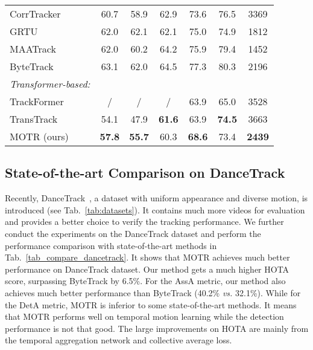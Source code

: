 \documentclass[runningheads]{llncs}
\begin{document}
\begin{table}[t]
{\begin{tabular}{l|cccccc}
      CorrTracker \cite{wang2021multiple}         & 60.7           & 58.9           & 62.9           & 73.6           & 76.5           & 3369            \\
      GRTU \cite{wang2021general}                 & 62.0           & 62.1           & 62.1           & 75.0           & 74.9           & 1812            \\
      MAATrack \cite{stadler2022modelling}        & 62.0           & 60.2           & 64.2           & 75.9           & 79.4           & 1452            \\
      ByteTrack \cite{zhang2021bytetrack}         & 63.1           & 62.0           & 64.5           & 77.3           & 80.3           & 2196            \\
      \hline
      \textit{Transformer-based:}                 &                &                &                &                &                &                 \\
      TrackFormer \cite{Meinhardt2021trackformer} & /              & /              & /              & 63.9           & 65.0           & 3528            \\
      TransTrack\cite{transtrack}                 & 54.1           & 47.9           & \textbf{61.6}  & 63.9           & \textbf{74.5}  & 3663            \\
      MOTR (ours)                                 & \textbf{57.8}  & \textbf{55.7}  & 60.3           & \textbf{68.6}  & 73.4           & \textbf{2439}   \\
      \hline
    \end{tabular}}
\label{tab_compare_sota}
\end{table}

\subsection{State-of-the-art Comparison on DanceTrack}
Recently, DanceTrack~\cite{peize2021dance}, a dataset with uniform appearance and diverse motion, is introduced (see Tab.~\ref{tab:datasets}). It contains much more videos for evaluation and provides a better choice to verify the tracking performance.
We further conduct the experiments on the DanceTrack dataset and perform the performance comparison with state-of-the-art methods in Tab.~\ref{tab_compare_dancetrack}. It shows that MOTR achieves much better performance on DanceTrack dataset.
Our method gets a much higher HOTA score, surpassing ByteTrack by 6.5\%. For the AssA metric, our method also achieves much better performance than ByteTrack (40.2\% \textit{vs.} 32.1\%). While for the DetA metric, MOTR is inferior to some state-of-the-art methods. It means that MOTR performs well on temporal motion learning while the detection performance is not that good. The large improvements on HOTA are mainly from the temporal aggregation network and collective average loss.
\end{document}
